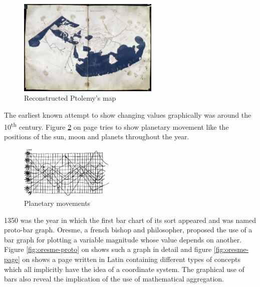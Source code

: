 \begin{figure}[!htb]
\centering
\includegraphics[width=0.6\textwidth,keepaspectratio]{images/history/ptolemy-map.jpg}
\caption[
    Reconstructed Ptolemy's map, Urldate: 07.2016 \newline
\small\texttt{\url{https://upload.wikimedia.org/wikipedia/commons/2/23/PtolemyWorldMap.jpg}}
]{Reconstructed Ptolemy's map}
\label{fig:ptolemy}
\end{figure}

The earliest known attempt to show changing values graphically was around the 10\textsuperscript{th} century. Figure \ref{fig:planetary-movement} on page \pageref{fig:planetary-movement} tries to show planetary
movement like the positions of the sun, moon and planets throughout the year.

\begin{figure}[!htb]
\centering
\includegraphics[width=0.4\textwidth,keepaspectratio]{images/history/planetary-movement.jpg}
\caption[
    Planetary movements, Urldate: 07.2016 \newline
\small\texttt{\url{http://www.fi.uu.nl/wiskrant/artikelen/hist_grafieken/begin/images/planeten.gif}}
]{Planetary movements}
\label{fig:planetary-movement}
\end{figure}

1350 was the year in which the first bar chart of its sort appeared and was named proto-bar graph. Oresme, a french bishop and philosopher, proposed the use of a bar graph for plotting a variable magnitude whose value depends on another. Figure \ref{fig:oresme-proto} on \pageref{fig:oresme-proto} shows such a graph in detail and figure \ref{fig:oresme-page} on \pageref{fig:oresme-page} shows a page written in Latin containing different types of concepts which all implicitly have the idea of a coordinate system. The graphical use of bars also reveal the implication of the use of mathematical aggregation.

